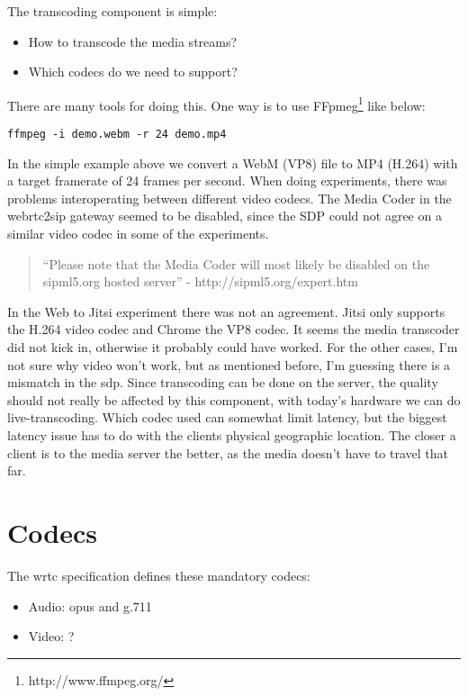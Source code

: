 The transcoding component is simple:

\begin{itemize}
\item{How to transcode the media streams?}
\item{Which codecs do we need to support?}
\end{itemize}

There are many tools for doing this. One way is to use FFpmeg\footnote{http://www.ffmpeg.org/} like below:

\begin{lstlisting}
ffmpeg -i demo.webm -r 24 demo.mp4
\end{lstlisting}

In the simple example above we convert a WebM (VP8) file to MP4 (H.264) with a target framerate of 24 frames per second.
When doing experiments, there was problems interoperating between different video codecs. The Media Coder in the webrtc2sip gateway seemed to be disabled, since the SDP could not agree on a similar video codec in some of the experiments.

\begin{quote}
``Please note that the Media Coder will most likely be disabled on the sipml5.org hosted server'' - http://sipml5.org/expert.htm
\end{quote}

In the Web to Jitsi experiment there was not an agreement. Jitsi only supports the H.264 video codec and Chrome the VP8 codec. It seems the media transcoder did not kick in, otherwise it probably could have worked. For the other cases, I'm not sure why video won't work, but as mentioned before, I'm guessing there is a mismatch in the \gls{sdp}. Since transcoding can be done on the server, the quality should not really be affected by this component, with today's hardware we can do live-transcoding. Which codec used can somewhat limit latency, but the biggest latency issue has to do with the clients physical geographic location. The closer a client is to the media server the better, as the media doesn't have to travel that far.

\section{Codecs}

The \gls{wrtc} specification defines these mandatory codecs:
\begin{itemize}
    \item Audio: opus and g.711
    \item Video: ?
\end{itemize}


